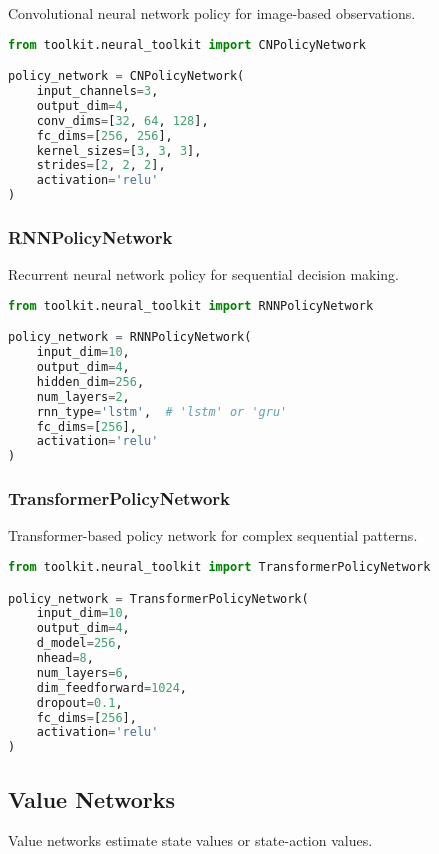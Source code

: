 Convolutional neural network policy for image-based observations.

\begin{lstlisting}[language=python, caption=CNN Policy Network]
from toolkit.neural_toolkit import CNPolicyNetwork

policy_network = CNPolicyNetwork(
    input_channels=3,
    output_dim=4,
    conv_dims=[32, 64, 128],
    fc_dims=[256, 256],
    kernel_sizes=[3, 3, 3],
    strides=[2, 2, 2],
    activation='relu'
)
\end{lstlisting}

\subsubsection{RNNPolicyNetwork}

Recurrent neural network policy for sequential decision making.

\begin{lstlisting}[language=python, caption=RNN Policy Network]
from toolkit.neural_toolkit import RNNPolicyNetwork

policy_network = RNNPolicyNetwork(
    input_dim=10,
    output_dim=4,
    hidden_dim=256,
    num_layers=2,
    rnn_type='lstm',  # 'lstm' or 'gru'
    fc_dims=[256],
    activation='relu'
)
\end{lstlisting}

\subsubsection{TransformerPolicyNetwork}

Transformer-based policy network for complex sequential patterns.

\begin{lstlisting}[language=python, caption=Transformer Policy Network]
from toolkit.neural_toolkit import TransformerPolicyNetwork

policy_network = TransformerPolicyNetwork(
    input_dim=10,
    output_dim=4,
    d_model=256,
    nhead=8,
    num_layers=6,
    dim_feedforward=1024,
    dropout=0.1,
    fc_dims=[256],
    activation='relu'
)
\end{lstlisting}

\subsection{Value Networks}

Value networks estimate state values or state-action values.

